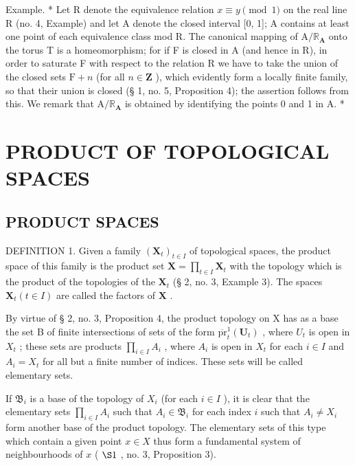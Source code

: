 Example. * Let R denote the equivalence relation \(x \equiv y \pmod{1}\) on the real line R (no. 4, Example) and let A denote the closed interval {[}0, 1{]}; A contains at least one point of each equivalence class mod R. The canonical mapping of \(\mathrm{A} / \mathbb{R}_{\mathbf{A}}\) onto the torus T is a homeomorphism; for if F is closed in A (and hence in R), in order to saturate F with respect to the relation R we have to take the union of the closed sets \(\mathrm{F} + n\) (for all \(n \in \mathbf{Z}\) ), which evidently form a locally finite family, so that their union is closed (§ 1, no. 5, Proposition 4); the assertion follows from this. We remark that \(\mathrm{A} / \mathbb{R}_{\mathbf{A}}\) is obtained by identifying the points 0 and 1 in A. *

\section{PRODUCT OF TOPOLOGICAL SPACES}

\subsection{PRODUCT SPACES}

DEFINITION 1. Given a family \((\mathbf{X}_{t})_{t\in I}\) of topological spaces, the product space of this family is the product set \(\mathbf{X} = \prod_{t\in I}\mathbf{X}_{t}\) with the topology which is the product of the topologies of the \(\mathbf{X}_{t}\) (§ 2, no. 3, Example 3). The spaces \(\mathbf{X}_{t}(t\in I)\) are called the factors of \(\mathbf{X}\) .

By virtue of § 2, no. 3, Proposition 4, the product topology on X has as a base the set B of finite intersections of sets of the form \(\overline{\mathrm{pr}}_{t}^{1}(\mathbf{U}_{t})\) , where \(U_{t}\) is open in \(X_{t}\) ; these sets are products \(\prod_{i\in I}A_{i}\) , where \(A_{i}\) is open in \(X_{t}\) for each \(i\in I\) and \(A_{i}=X_{t}\) for all but a finite number of indices. These sets will be called elementary sets.

If \(\mathfrak{B}_i\) is a base of the topology of \(X_i\) (for each \(i \in I\) ), it is clear that the elementary sets \(\prod_{i \in I} A_i\) such that \(A_i \in \mathfrak{B}_i\) for each index \(i\) such that \(A_i \neq X_i\) form another base of the product topology. The elementary sets of this type which contain a given point \(x \in X\) thus form a fundamental system of neighbourhoods of \(x\) ( \(\S 1\) , no. 3, Proposition 3).

